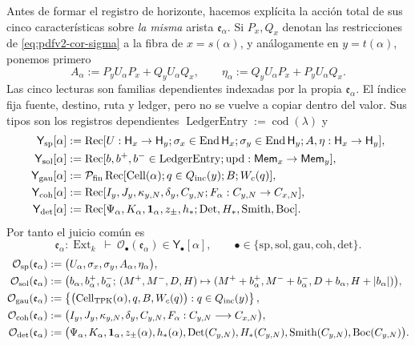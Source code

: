 Antes de formar el registro de horizonte, hacemos explícita la acción total
de sus cinco características sobre \emph{la misma} arista
\(\mathfrak e_\alpha\). Si \(P_x,Q_x\) denotan las restricciones de
\eqref{eq:pdfv2-cor-sigma} a la fibra de \(x=s(\alpha)\), y análogamente en
\(y=t(\alpha)\), ponemos primero
\begin{equation}
\label{eq:pdfv2-cor-a-eta-emision}
 A_\alpha:=P_yU_\alpha P_x+Q_yU_\alpha Q_x,
 \qquad
 \eta_\alpha:=Q_yU_\alpha P_x+P_yU_\alpha Q_x.
\end{equation}
Las cinco lecturas son familias dependientes indexadas por la propia
\(\mathfrak e_\alpha\). El índice fija fuente, destino, ruta y ledger, pero
no se vuelve a copiar dentro del valor. Sus tipos son los registros
dependientes
\(\operatorname{LedgerEntry}:=\operatorname{cod}(\lambda)\) y
\begin{align*}
 \mathsf Y_{\rm sp}[\alpha]&:=
 \operatorname{Rec}[U:\mathsf H_x\to\mathsf H_y;
 \sigma_x\in\operatorname{End}\mathsf H_x;
 \sigma_y\in\operatorname{End}\mathsf H_y;A,\eta:\mathsf H_x\to\mathsf H_y],\\
 \mathsf Y_{\rm sol}[\alpha]&:=
 \operatorname{Rec}[b,b^+,b^-\in\operatorname{LedgerEntry};
 \operatorname{upd}:\mathsf{Mem}_x\to\mathsf{Mem}_y],\\
 \mathsf Y_{\rm gau}[\alpha]&:=
 \mathcal P_{\rm fin}\operatorname{Rec}[
 \operatorname{Cell}(\alpha);q\in Q_{\rm inc}(y);B;W_c(q)],\\
 \mathsf Y_{\rm coh}[\alpha]&:=
 \operatorname{Rec}[I_y,J_y,\kappa_{y,N},\delta_y,C_{y,N};
 F_\alpha:C_{y,N}\to C_{x,N}],\\
 \mathsf Y_{\rm det}[\alpha]&:=
 \operatorname{Rec}[\Psi_\alpha,K_\alpha,\mathbf1_\alpha,z_\pm,h_*;
 \operatorname{Det},H_*,\operatorname{Smith},\operatorname{Boc}].
\end{align*}
Por tanto el juicio común es
\[
 \mathfrak e_\alpha:\operatorname{Ext}_k\ \vdash\
 \mathcal O_\bullet(\mathfrak e_\alpha)
 \in\mathsf Y_\bullet[\alpha],
 \qquad
 \bullet\in\{\mathrm{sp,sol,gau,coh,det}\}.
\]
\begin{align}
 \mathcal O_{\rm sp}(\mathfrak e_\alpha)
 &:=
 \bigl(U_\alpha,\sigma_x,\sigma_y,
 A_\alpha,\eta_\alpha\bigr),
 \label{eq:pdfv2-cor-accion-sp}\\
 \mathcal O_{\rm sol}(\mathfrak e_\alpha)
 &:=
 \bigl(b_\alpha,b_\alpha^+,b_\alpha^-;\,
 (M^+,M^-,D,H)\mapsto
 (M^++b_\alpha^+,M^-+b_\alpha^-,
  D+b_\alpha,H+|b_\alpha|)\bigr),
 \label{eq:pdfv2-cor-accion-sol}\\
 \mathcal O_{\rm gau}(\mathfrak e_\alpha)
 &:=
 \left\{
 \bigl(\operatorname{Cell}_{\rm TPK}(\alpha),
 q,B,W_c(q)\bigr):
 q\in Q_{\rm inc}(y)
 \right\},
 \label{eq:pdfv2-cor-accion-gau}\\
 \mathcal O_{\rm coh}(\mathfrak e_\alpha)
 &:=
 \bigl(I_y,J_y,\kappa_{y,N},\delta_y,C_{y,N},
 F_\alpha:C_{y,N}\longrightarrow C_{x,N}\bigr),
 \label{eq:pdfv2-cor-accion-coh}\\
 \mathcal O_{\rm det}(\mathfrak e_\alpha)
 &:=
 \bigl(\Psi_\alpha,K_\alpha,\mathbf1_\alpha,z_\pm(\alpha),
 h_*(\alpha),\operatorname{Det}(C_{y,N}),H_*(C_{y,N}),
 \operatorname{Smith}(C_{y,N}),\operatorname{Boc}(C_{y,N})\bigr).
 \label{eq:pdfv2-cor-accion-det}
\end{align}

